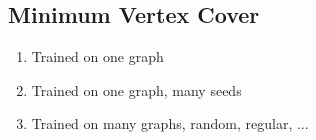 \subsection{Minimum Vertex Cover}
\begin{enumerate}
    \item Trained on one graph

    \item Trained on one graph, many seeds

    \item Trained on many graphs, random, regular, ...
\end{enumerate}